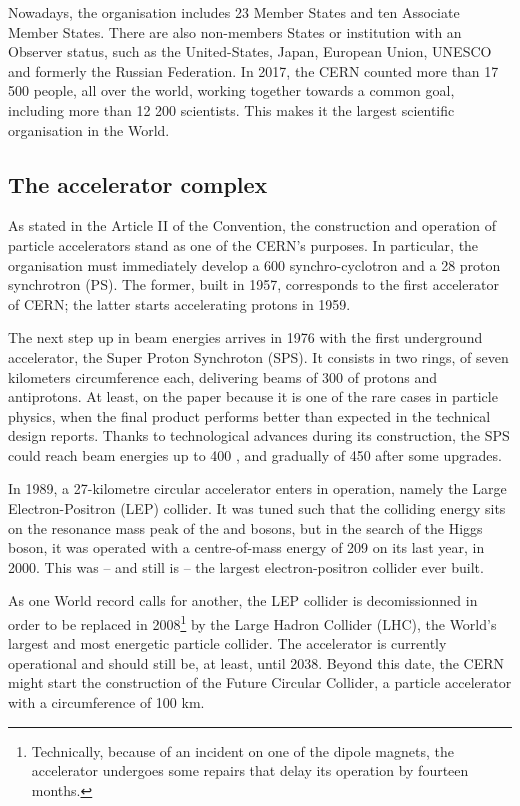Nowadays, the organisation includes 23 Member States and ten Associate Member States. There are also non-members States or institution with an Observer status, such as the United-States, Japan, European Union, UNESCO and formerly the Russian Federation. In 2017, the CERN counted more than 17 500 people, all over the world, working together towards a common goal, including more than 12 200 scientists\cite{cernOurPeople2023}. This makes it the largest scientific organisation in the World.

\subsection{The accelerator complex}
\label{subsec:AcceleratorComplex}

As stated in the Article II of the Convention, the construction and operation of particle accelerators stand as one of the CERN's purposes. In particular, the organisation must immediately develop a 600 \mev synchro-cyclotron and a 28 \gev proton synchrotron (PS). The former, built in 1957, corresponds to the first accelerator of CERN; the latter starts accelerating protons in 1959.

The next step up in beam energies arrives in 1976 with the first underground accelerator, the Super Proton Synchroton (SPS). It consists in two rings, of seven kilometers circumference each, delivering beams of 300 \gev of protons and antiprotons. At least, on the paper because it is one of the rare cases in particle physics, when the final product performs better than expected in the technical design reports. Thanks to technological advances during its construction, the SPS could reach beam energies up to 400 \gev, and gradually of 450 \gev after some upgrades.

In 1989, a 27-kilometre circular accelerator enters in operation, namely the Large Electron-Positron (LEP) collider. It was tuned such that the colliding energy sits on the resonance mass peak of the \rmZzero and \rmWplusminus bosons, but in the search of the Higgs boson, it was operated with a centre-of-mass energy of 209 \gev on its last year, in 2000. This was -- and still is -- the largest electron-positron collider ever built.

As one World record calls for another, the LEP collider is decomissionned in order to be replaced in 2008\footnote{Technically, because of an incident on one of the dipole magnets, the accelerator undergoes some repairs that delay its operation by fourteen months.} by the Large Hadron Collider (LHC), the World's largest and most energetic particle collider. The accelerator is currently operational and should still be, at least, until 2038. Beyond this date, the CERN might start the construction of the Future Circular Collider, a particle accelerator with a circumference of 100 km\cite{FutureCircularCollider2023}\cite{benediktFutureCircularCollider2019}.\\


